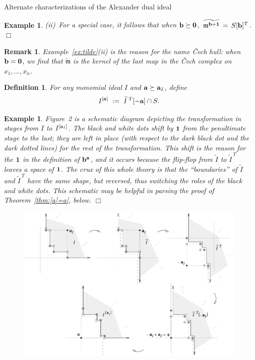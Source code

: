 \documentclass[12pt,leqno]{article}
\newtheorem{defn}[thm]{Definition}
\newtheorem{example}[thm]{Example}
\newtheorem{remark}[thm]{Remark}
\def\aa{{{\rm \bf a}}}
\def\bb{{{\rm \bf b}}}
\def\mm{{\mathfrak m}}
\begin{document}
\begin{section}{Alternate characterizations of the Alexander dual ideal}
\begin{example}
\noindent
(ii)\ For a special case, it follows that when $\bb \succeq {\bf 0}$, 
$\,\widetilde{\mm^{\bb + {\bf 1}}}\,=\,S[\bb]^T$.
%
\hfill
$\Box$
\end{example}
\begin{remark} \rm
Example~\ref{ex:tilde}(ii) is the reason for the name {\it \v Cech hull}:
when $\bb = {\bf 0}$, we find that $\widetilde{\mm}$ is the kernel of the
last map in the \v Cech complex on $x_1,\ldots,x_n$.
\end{remark}

\begin{defn} \label{defn:[a]}
For any monomial ideal $I$ and $\aa \succeq \aa_I$, define
$$
	I^{[\aa]}\ :=\ \widetilde{I}^{\;T}[-\aa] \cap S.
$$
\end{defn}
\begin{example} \rm \label{ex:zz2}
Figure~2 is a schematic diagram depicting the transformation in stages
from $I$ to $I^{[\aa_I]}$.  The black and white dots shift by ${\bf 1}$
from the penultimate stage to the last; they are left in place (with
respect to the dark black dot and the dark dotted lines) for the rest of
the transformation.  This shift is the reason for the ${\bf 1}$ in the
definition of $\bb^\aa$, and it occurs because the flip-flop from
$\widetilde{I}$ to $\widetilde{I}^{\:T}$ leaves a space of ${\bf 1}$.
The crux of this whole theory is that the ``boundaries'' of
$\widetilde{I}$ and $\widetilde{I}^{\:T}$ have the same shape, but
reversed, thus switching the roles of the black and white dots.  This
schematic may be helpful in parsing the proof of Theorem~\ref{thm:[a]=a},
below.  \hfill $\Box$
\end{example}
\begin{figure}[!t]
\vbox{\centering
\includegraphics{cechHull}\\
}
\end{figure}
\end{section}
\end{document}
